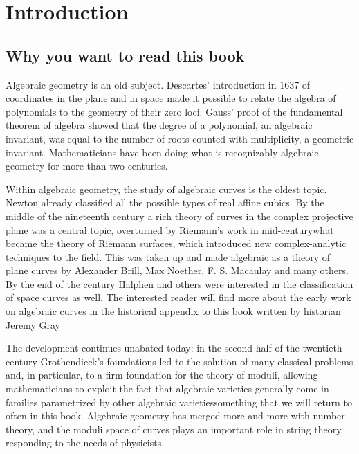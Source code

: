 

\addtocounter{chapter}{-1}
\chapter{Introduction}
\label{IntroChapter}

\section*{Why you want to read this book}

Algebraic geometry is an old subject. 
Descartes'
%
introduction in 1637 of coordinates in the plane and in space made it
possible to relate the algebra of polynomials to the geometry of their
zero loci. 
Gauss' 
%
proof of the 
fundamental theorem of algebra
%
showed
that the degree of a polynomial, an algebraic invariant, was equal to
the number of roots counted with multiplicity, a geometric invariant.
Mathematicians have been doing what is recognizably algebraic geometry
for more than two centuries.

Within algebraic geometry, the study of algebraic curves is the oldest topic. Newton already classified all the possible types of real affine cubics. By the middle of
%
%
%
the 
nineteenth
century a rich theory of curves in the complex projective plane was a
central topic, overturned by Riemann's work in mid-century\emdash what
became the theory of Riemann surfaces, which introduced new 
complex-analytic techniques
to the field. This was  taken up and made
algebraic as a theory of plane curves by Alexander Brill, Max Noether,
F. S. Macaulay and many others. By the end of the century 
Halphen
and
others were interested in the classification of space curves as well.
The interested reader will find more about the 
%
early work on algebraic curves in the 
historical appendix to this book
written by historian Jeremy Gray

The development continues unabated today: in the second half of the
twentieth 
century 
Grothendieck's
foundations led to the solution of many
classical problems and, in particular, to a firm foundation for the
theory of moduli, allowing mathematicians to exploit the fact that
algebraic varieties generally come in families parametrized by other
algebraic varieties\emdash something that we will return to often in
this book. Algebraic geometry has merged more and more with number
theory, and the moduli space of curves plays an important role in
string theory, responding to the needs of physicists.


